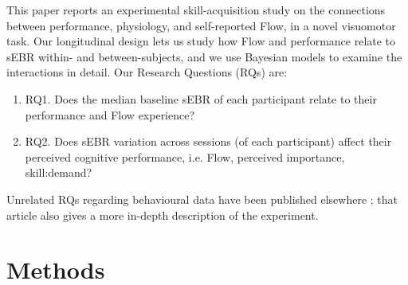 \documentclass[10pt,letterpaper,floatsintext]{article}
\begin{document}
This paper reports an experimental skill-acquisition study on the connections between performance, physiology, and self-reported Flow, in a novel visuomotor task. Our longitudinal design lets us study how Flow and performance relate to sEBR within- and between-subjects, and we use Bayesian models to examine the interactions in detail. Our Research Questions (RQs) are:

%

\begin{enumerate}
	\item RQ1. Does the median baseline sEBR of each participant relate to their performance and Flow experience?

	\item RQ2. Does sEBR variation across sessions (of each participant) affect their perceived cognitive performance, i.e. Flow, perceived importance, skill:demand?

\end{enumerate}

Unrelated RQs regarding behavioural data have been published elsewhere \cite{Cowley2019flow}; that article also gives a more in-depth description of the experiment.

\section{Methods}
\end{document}
